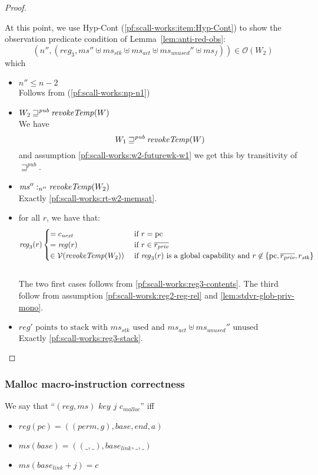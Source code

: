 \documentclass[a4paper]{article}
\newcommand{\var}[1]{\mathit{#1}}
\newcommand{\hs}{\var{ms}}
\newcommand{\ms}{\hs}
\newcommand{\gl}{\var{g}}
\newcommand{\pcreg}{\mathrm{pc}}
\newcommand{\addr}{\var{a}}
\newcommand{\start}{\var{base}}
\newcommand{\addrend}{\var{end}}
\newcommand{\reg}{\var{reg}}
\newcommand{\heap}{\var{mem}}
\newcommand{\perm}{\var{perm}}
\newcommand{\stdcap}[1][(\perm,\gl)]{\left(#1,\start,\addrend,\addr \right)}
\newcommand{\link}{\var{link}}
\newcommand{\stk}{\var{stk}}
\newcommand{\unused}{\var{unused}}
\newcommand{\act}{\var{act}}
\newcommand{\plainfun}[2]{
  \ifthenelse{\equal{#2}{}}
  {\mathit{#1}}
  {\mathit{#1}(#2)}
}
\newcommand{\revokeTemp}[1]{\plainfun{revokeTemp}{#1}}
\newcommand{\futurewk}{\mathbin{\sqsupseteq}^{\var{pub}}}
\newcommand{\heapSat}[3][\heap]{#1 :_{#2} #3}
\newcommand{\memSat}[3][n]{\heapSat[#2]{#1}{#3}}
\newcommand{\codelabel}[1]{\mathit{#1}}
\newcommand{\malloc}{\codelabel{malloc}}
\newcommand{\asmType}{\plaindom{AsmType}}
\newcommand{\plaindom}[1]{\mathrm{#1}}
\newcommand{\intr}[2]{\mathcal{#1}}
\newcommand{\valueintr}[1]{\intr{V}{#1}}
\newcommand{\stdvr}{\valueintr{\asmType}}
\newcommand{\observations}{\mathcal{O}}
\newcommand{\npair}[2][n]{\left(#1,#2 \right)}
\newcommand{\linksto}[4]{\ensuremath{#1} \text{ links } \ensuremath{#2} \text{ as } \ensuremath{#3} \text{ to } \ensuremath{#4}}
\begin{document}
\begin{proof}
\begin{enumproof}[resume]
      At this point, we use Hyp-Cont (\ref{pf:scall-works:item:Hyp-Cont}) to show the observation predicate condition of Lemma~\ref{lem:anti-red-obs}:
      \[
        \npair[n'']{(reg_3,\ms'' \uplus \ms_\stk \uplus \ms_\act \uplus \ms_\unused'' \uplus \ms_f)} \in \observations(W_2)
      \]
      which 
      \begin{itemize}
      \item $n'' \leq n-2$ \\
        Follows from (\ref{pf:scall-works:np-n1})
      \item $W_2 \futurewk \revokeTemp{W}$ \\
        We have 
        \[
          W_1 \futurewk \revokeTemp{W}
        \]
        and assumption \ref{pf:scall-works:w2-futurewk-w1} we get this by transitivity of $\futurewk$.
      \item $\memSat[n'']{\ms''}{\revokeTemp{W_2}}$ \\
        Exactly \ref{pf:scall-works:rt-w2-memsat}.        
      \item for all $r$, we have that:
        \begin{equation*}
          \reg_3(r)
          \begin{cases}
            = c_{\mathit{next}} &\text{ if } r = \pcreg\\
            = \reg(r)&\text{ if } r \in \overline{r_{\mathit{priv}}}\\
            \in \stdvr(\revokeTemp{W_2}) &\text{ if $\reg_3(r)$ is a global capability and } r \not\in \{\pcreg,\overline{r_{\mathit{priv}}}, r_\stk\} %
          \end{cases}
        \end{equation*}\\
        The two first cases follows from \ref{pf:scall-works:reg3-contents}. The third follow from assumption \ref{pf:scall-worsk:reg2-reg-rel} and \ref{lem:stdvr-glob-priv-mono}.
      \item $\reg' \text{ points to stack with $\ms_\stk$ used and $\ms_\act \uplus \ms_{\mathit{unused}}''$ unused}$\\
        Exactly \ref{pf:scall-works:reg3-stack}.
      \end{itemize}
  \end{enumproof}
\end{proof}

\subsubsection{Malloc macro-instruction correctness}
\begin{definition}
  We say that ``\linksto{(\reg,\ms)}{\var{key}}{j}{c_\malloc}'' 
  iff
  \begin{itemize}
  \item $\reg(pc) = \stdcap$
  \item $\ms(\start) = ((\_,\_),\start_\link,\_,\_)$
  \item $\ms(\start_\link+j) = c$
  \end{itemize}
\end{definition}
\end{document}
